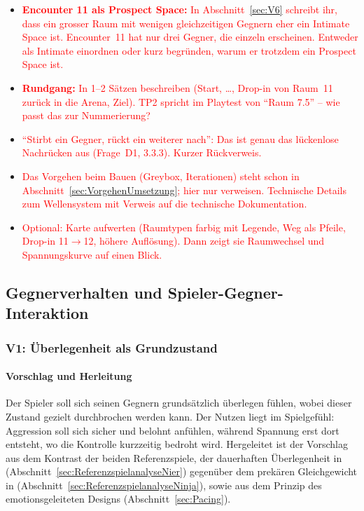 \documentclass[../Main.tex]{subfiles}
\begin{document}
\begin{itemize}[leftmargin=1.5cm]
    \item \textcolor{red}{\textbf{Encounter 11 als Prospect Space:} In Abschnitt~\ref{sec:V6} schreibt ihr, dass ein grosser Raum mit wenigen gleichzeitigen Gegnern eher ein Intimate Space ist. Encounter~11 hat nur drei Gegner, die einzeln erscheinen. Entweder als Intimate einordnen oder kurz begründen, warum er trotzdem ein Prospect Space ist.}
    \item \textcolor{red}{\textbf{Rundgang:} In 1--2 Sätzen beschreiben (Start, \ldots, Drop-in von Raum~11 zurück in die Arena, Ziel). TP2 spricht im Playtest von \enquote{Raum 7.5} -- wie passt das zur Nummerierung?}
    \item \textcolor{red}{\enquote{Stirbt ein Gegner, rückt ein weiterer nach}: Das ist genau das lückenlose Nachrücken aus  (Frage~D1, 3.3.3). Kurzer Rückverweis.}
    \item \textcolor{red}{Das Vorgehen beim Bauen (Greybox, Iterationen) steht schon in Abschnitt~\ref{sec:VorgehenUmsetzung}; hier nur verweisen. Technische Details zum Wellensystem mit Verweis auf die technische Dokumentation.}
    \item \textcolor{red}{Optional: Karte aufwerten (Raumtypen farbig mit Legende, Weg als Pfeile, Drop-in 11$\rightarrow$12, höhere Auflösung). Dann zeigt sie Raumwechsel und Spannungskurve auf einen Blick.}
\end{itemize}

\subsection{Gegnerverhalten und Spieler-Gegner-Interaktion} \label{sec:UmsetzungGegner}

\subsubsection{V1: Überlegenheit als Grundzustand} \label{sec:V1}

\paragraph{Vorschlag und Herleitung}
Der Spieler soll sich seinen Gegnern grundsätzlich überlegen fühlen, wobei dieser Zustand gezielt durchbrochen werden kann. Der Nutzen liegt im Spielgefühl: Aggression soll sich sicher und belohnt anfühlen, während Spannung erst dort entsteht, wo die Kontrolle kurzzeitig bedroht wird. Hergeleitet ist der Vorschlag aus dem Kontrast der beiden Referenzspiele, der dauerhaften Überlegenheit in  (Abschnitt~\ref{sec:ReferenzspielanalyseNier}) gegenüber dem prekären Gleichgewicht in  (Abschnitt~\ref{sec:ReferenzspielanalyseNinja}), sowie aus dem Prinzip des emotionsgeleiteten Designs (Abschnitt~\ref{sec:Pacing}).
\end{document}
